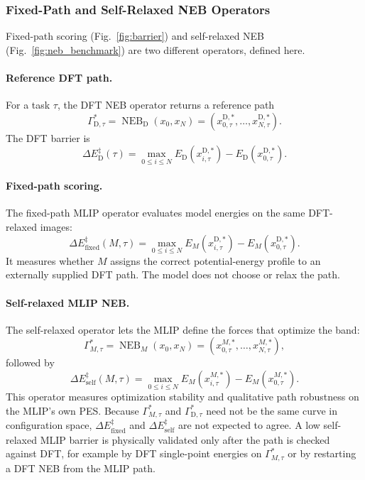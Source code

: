 \subsubsection{Fixed-Path and Self-Relaxed NEB Operators}
\label{sec:neb_operators_formal}

Fixed-path scoring (Fig.~\ref{fig:barrier}) and self-relaxed NEB (Fig.~\ref{fig:neb_benchmark}) are two different operators, defined here.

\paragraph{Reference DFT path.}
For a task $\tau$, the DFT NEB operator returns a reference path
\[
    \Gamma_{\mathrm D,\tau}^{*}
    =
    \operatorname{NEB}_{\mathrm D}(x_0,x_N)
    =
    (x_{0,\tau}^{\mathrm D,*},\ldots,x_{N,\tau}^{\mathrm D,*}).
\]
The DFT barrier is
\[
    \Delta E_{\mathrm D}^{\ddagger}(\tau)
    =
    \max_{0\le i\le N}
    E_{\mathrm D}(x_{i,\tau}^{\mathrm D,*})
    -
    E_{\mathrm D}(x_{0,\tau}^{\mathrm D,*}).
\]

\paragraph{Fixed-path scoring.}
The fixed-path MLIP operator evaluates model energies on the same DFT-relaxed images:
\[
    \Delta E_{\mathrm{fixed}}^{\ddagger}(M,\tau)
    =
    \max_{0\le i\le N}
    E_M(x_{i,\tau}^{\mathrm D,*})
    -
    E_M(x_{0,\tau}^{\mathrm D,*}).
\]
It measures whether $M$ assigns the correct potential-energy profile to an externally supplied DFT path. The model does not choose or relax the path.

\paragraph{Self-relaxed MLIP NEB.}
The self-relaxed operator lets the MLIP define the forces that optimize the band:
\[
    \Gamma_{M,\tau}^{*}
    =
    \operatorname{NEB}_{M}(x_0,x_N)
    =
    (x_{0,\tau}^{M,*},\ldots,x_{N,\tau}^{M,*}),
\]
followed by
\[
    \Delta E_{\mathrm{self}}^{\ddagger}(M,\tau)
    =
    \max_{0\le i\le N}
    E_M(x_{i,\tau}^{M,*})
    -
    E_M(x_{0,\tau}^{M,*}).
\]
This operator measures optimization stability and qualitative path robustness on the MLIP's own PES. Because $\Gamma_{M,\tau}^{*}$ and $\Gamma_{\mathrm D,\tau}^{*}$ need not be the same curve in configuration space, $\Delta E_{\mathrm{fixed}}^{\ddagger}$ and $\Delta E_{\mathrm{self}}^{\ddagger}$ are not expected to agree. A low self-relaxed MLIP barrier is physically validated only after the path is checked against DFT, for example by DFT single-point energies on $\Gamma_{M,\tau}^{*}$ or by restarting a DFT NEB from the MLIP path.

